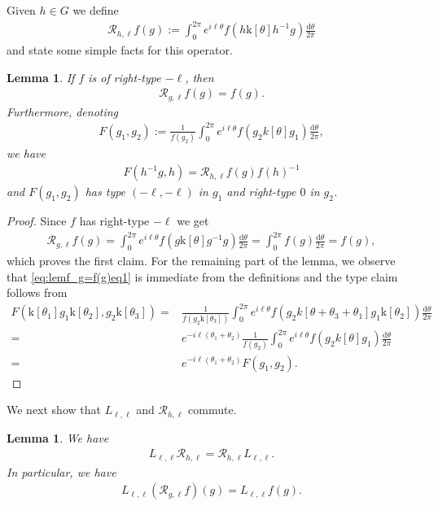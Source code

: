 \documentclass[12pt]{amsart}
\newtheorem{lemma}[theorem]{Lemma}
\theoremstyle{definition}
\theoremstyle{remark}
\numberwithin{equation}{section}
\newcommand{\1}{{\mathbf 1}}
\renewcommand{\d}{\mathrm d}
\begin{document}
Given $h\in G$ we define
\begin{align*}
  \mathcal{R}_{h,\ell}  f(g) := \int_0^{2\pi} e^{i\ell \theta}  f(h \mathrm{k}[\theta] h^{-1} g) \frac{\d \theta}{2\pi}
\end{align*}
and state some simple facts for this operator.
\begin{lemma}\label{lem:f_g(g)=f(g)}
    If $f$ is of right-type $-\ell$,  then
    \begin{align*}
          \mathcal{R}_{g,\ell} f(g) = f(g).
    \end{align*}
    Furthermore, denoting
    \begin{align} \label{eq:FdefinitionR}
        F(g_1,g_2) :=  \frac{1}{f(g_2)} \int_0^{2\pi} e^{i\ell \theta} f(g_2 k[\theta] g_1) \frac{\d \theta}{2\pi},
    \end{align}
    we have
    \begin{align}\label{eq:lemf_g=f(g)eq1}
        F(h^{-1} g, h)=   \mathcal{R}_{h,\ell}f(g) f(h)^{-1} 
    \end{align}
    and $F(g_1,g_2)$ has type $(-\ell,-\ell)$ in $g_1$ and right-type $0$ in $g_2$.
\end{lemma}
\begin{proof}
 Since $f$ has right-type $-\ell$ we get 
 \begin{align*}
    \mathcal{R}_{g,\ell}  f(g) = \int_0^{2\pi} e^{i\ell \theta}  f(g \mathrm{k}[\theta] g^{-1} g) \frac{\d \theta}{2\pi} =   \int_0^{2\pi} f(g ) \frac{\d \theta}{2\pi} = f(g),
 \end{align*}
which proves the first claim. For the remaining part of the lemma, we observe that \eqref{eq:lemf_g=f(g)eq1} is immediate from the definitions and the type claim follows from
\begin{align*}
     F(\mathrm{k}[\theta_1] g_1\mathrm{k}[\theta_2] ,g_2 \mathrm{k}[\theta_3] ) = &\frac{1}{f(g_2 \mathrm{k}[\theta_3])} \int_0^{2\pi} e^{i\ell\theta} f(g_2  k[\theta +\theta_3 + \theta_1] g_1\mathrm{k}[\theta_2]) \frac{\d \theta}{2\pi}\\
     = &e^{-i\ell (\theta_1 + \theta_2) } \frac{1}{f(g_2)}  \int_0^{2\pi} e^{i\ell \theta} f(g_2 k[\theta] g_1) \frac{\d \theta}{2\pi}\\
     =& e^{-i\ell (\theta_1 + \theta_2) }F(g_1,g_2).
\end{align*}
\end{proof}
We next show that $L_{\ell,\ell}$ and $ \mathcal{R}_{h,\ell}$ commute.
\begin{lemma} \label{le:Llfg}
    We have
    \begin{align*}
        L_{\ell,\ell}   \mathcal{R}_{h,\ell} =   \mathcal{R}_{h,\ell} L_{\ell,\ell}.
    \end{align*}
    In  particular, we have
    \begin{align*}
        L_{\ell,\ell}   (\mathcal{R}_{g,\ell}f)(g) =   L_{\ell,\ell}   f(g).
    \end{align*}
\end{lemma}
\end{document}
